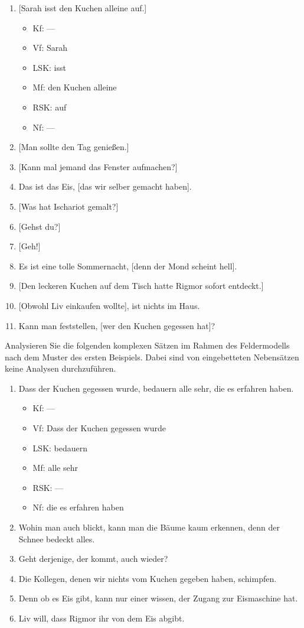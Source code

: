 \begin{enumerate}\Lf
  \item{[Sarah isst den Kuchen alleine auf.]}
    \begin{itemize}\Lf
      \item Kf: ---
      \item Vf: Sarah
      \item LSK: isst
      \item Mf: den Kuchen alleine
      \item RSK: auf
      \item Nf: ---
    \end{itemize}
  \item{[Man sollte den Tag genießen.]}
  \item{[Kann mal jemand das Fenster aufmachen?]}
  \item\label{it:934254} Das ist das Eis, [das wir selber gemacht haben].
  \item{[Was hat Ischariot gemalt?]}
  \item{[Gehst du?]}
  \item{\label{it:7493} [Geh!]}
  \item\label{it:7494} Es ist eine tolle Sommernacht, [denn der Mond scheint hell].
  \item{[Den leckeren Kuchen auf dem Tisch hatte Rigmor sofort entdeckt.]}
  \item{[Obwohl Liv einkaufen wollte], ist nichts im Haus.}
  \item Kann man feststellen, [wer den Kuchen gegessen hat]?
\end{enumerate}

\Uebung \label{u122} Analysieren Sie die folgenden komplexen Sätzen im Rahmen des Feldermodells nach dem Muster des ersten Beispiels.
Dabei sind von eingebetteten Nebensätzen keine Analysen durchzuführen.

\begin{enumerate}\Lf
  \item Dass der Kuchen gegessen wurde, bedauern alle sehr, die es erfahren haben.
    \begin{itemize}\Lf
      \item Kf: ---
      \item Vf: Dass der Kuchen gegessen wurde
      \item LSK: bedauern
      \item Mf: alle sehr
      \item RSK: ---
      \item Nf: die es erfahren haben
    \end{itemize}
  \item Wohin man auch blickt, kann man die Bäume kaum erkennen, denn der Schnee bedeckt alles.
  \item Geht derjenige, der kommt, auch wieder?
  \item Die Kollegen, denen wir nichts vom Kuchen gegeben haben, schimpfen.
  \item Denn ob es Eis gibt, kann nur einer wissen, der Zugang zur Eismaschine hat.
  \item Liv will, dass Rigmor ihr von dem Eis abgibt.
\end{enumerate}

